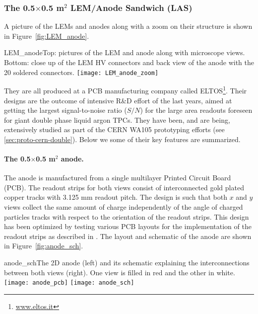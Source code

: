  \subsubsection{The 0.5$\times$0.5 m$^2$  LEM/Anode Sandwich (LAS)}

 A picture of the LEMs and anodes along with a zoom on  their structure is shown in Figure~\ref{fig:LEM_anode}.

\begin{cdrfigure}{LEM_anode}{Top: pictures of the LEM and anode along with microscope
  views. Bottom: close up of the LEM HV connectors and back view of the anode with the 20 soldered connectors.}
 \texttt{[image: LEM\_anode\_zoom]}  
 \end{cdrfigure}

 They are all produced at a PCB manufacturing company called  ELTOS\footnote{\url{www.eltos.it}}. Their designs are the outcome of intensive R\&D effort of the last years, aimed at getting the   largest signal-to-noise ratio ($S/N$) for the large area readouts  foreseen for giant double phase liquid argon TPCs. They have been,  and are being, extensively studied as part of the CERN WA105  prototyping efforts (see \ref{sec:proto-cern-double}). Below we some of their key features are summarized.

 \paragraph{The 0.5$\times$0.5 m$^2$ anode.}
The anode is manufactured from a single multilayer Printed Circuit Board (PCB). The  readout strips for both views consist of interconnected gold plated copper tracks  with 3.125 mm readout pitch.  The design is such that  both $x$ and $y$ views collect the same amount of charge  independently of the angle of charged particles tracks with respect to the orientation of the readout strips. This design has been optimized by testing various PCB layouts for the implementation of the readout strips as described in \cite{Cantini:2013yba}.  The layout and  schematic of the anode are shown in Figure~\ref{fig:anode_sch}.  

\begin{cdrfigure}{anode_sch}{The 2D anode (left) and its schematic explaining the
       interconnections between both views (right). One view is filled
       in red and the other in white.}
     \texttt{[image: anode\_pcb]} \hspace{0.2cm} \texttt{[image: anode\_sch]}
\end{cdrfigure}


